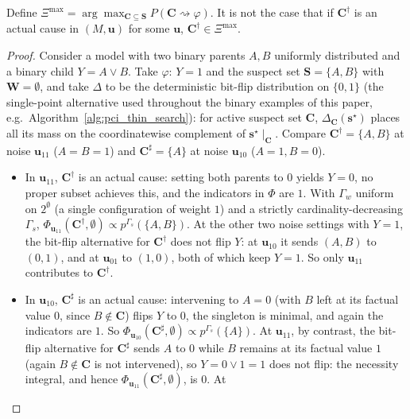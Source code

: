 \begin{observation}\label{obs:misalignment}
Define $\Xi^{\max}=\arg\max_{\mathbf{C}\subseteq\mathbf{S}} P(\mathbf{C}\!\rightsquigarrow\!\varphi)$.
It is not the case that if $\mathbf{C}^\dagger$ is an actual cause in $(M,\mathbf{u})$
for some $\mathbf{u}$, $\mathbf{C}^\dagger\in\Xi^{\max}$.
\end{observation}

\begin{proof}
Consider a model with two binary parents $A,B$ uniformly distributed and a binary
child $Y=A\vee B$. Take $\varphi:\,Y=1$ and the suspect set $\mathbf{S}=\{A,B\}$ with
$\mathbf{W}=\emptyset$, and take $\Delta$ to be the deterministic bit-flip
distribution on $\{0,1\}$ (the single-point alternative used throughout the
binary examples of this paper, e.g.\ Algorithm~\ref{alg:pci_thin_search}): for
active suspect set $\mathbf{C}$, $\Delta_{\mathbf{C}}(\mathbf{s}^\star)$ places
all its mass on the coordinatewise complement of $\mathbf{s}^\star\!\mid_{\mathbf{C}}$.
Compare $\mathbf{C}^\dagger=\{A,B\}$ at noise $\mathbf{u}_{11}$
($A=B=1$) and $\mathbf{C}^\sharp=\{A\}$ at noise $\mathbf{u}_{10}$ ($A=1,B=0$).
\begin{itemize}
\item In $\mathbf{u}_{11}$, $\mathbf{C}^\dagger$ is an actual cause: setting both
parents to $0$ yields $Y=0$, no proper subset achieves this, and the indicators in
$\Phi$ are $1$. With $\Gamma_w$ uniform on $2^{\emptyset}$ (a single configuration of
weight $1$) and a strictly cardinality-decreasing $\Gamma_s$,
$\Phi_{\mathbf{u}_{11}}(\mathbf{C}^\dagger,\emptyset)\propto p^{\Gamma_s}(\{A,B\})$.
At the other two noise settings with $Y=1$, the bit-flip alternative for
$\mathbf{C}^\dagger$ does not flip $Y$: at $\mathbf{u}_{10}$ it sends $(A,B)$ to
$(0,1)$, and at $\mathbf{u}_{01}$ to $(1,0)$, both of which keep $Y=1$. So only
$\mathbf{u}_{11}$ contributes to $\mathbf{C}^\dagger$.
\item In $\mathbf{u}_{10}$, $\mathbf{C}^\sharp$ is an actual cause:
intervening to $A=0$ (with $B$ left at its factual value $0$, since $B\notin\mathbf{C}$) flips $Y$ to $0$, the singleton is minimal, and again the
indicators are $1$. So $\Phi_{\mathbf{u}_{10}}(\mathbf{C}^\sharp,\emptyset)\propto p^{\Gamma_s}(\{A\})$.
At $\mathbf{u}_{11}$, by contrast, the bit-flip alternative for $\mathbf{C}^\sharp$
sends $A$ to $0$ while $B$ remains at its factual value $1$ (again $B\notin\mathbf{C}$
is not intervened), so $Y=0\vee 1=1$ does not flip: the necessity integral, and
hence $\Phi_{\mathbf{u}_{11}}(\mathbf{C}^\sharp,\emptyset)$, is $0$. At

\end{itemize}
\end{proof}

